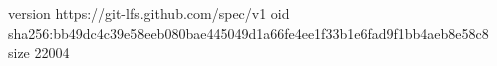 version https://git-lfs.github.com/spec/v1
oid sha256:bb49dc4c39e58eeb080bae445049d1a66fe4ee1f33b1e6fad9f1bb4aeb8e58c8
size 22004
